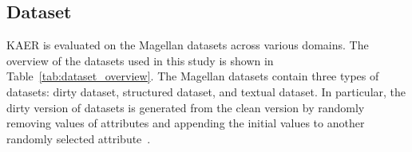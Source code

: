 \subsection{Dataset}

KAER is evaluated on the Magellan datasets \cite{magellandata} across various domains. 
The overview of the datasets used in this study is shown in Table~\ref{tab:dataset_overview}. 
The Magellan datasets contain three types of datasets: dirty dataset, structured dataset, and textual dataset.
In particular, the dirty version of datasets is generated from the clean version by randomly removing values of attributes and appending the initial values to another randomly selected attribute~\cite{li_deep_2020}.

\begin{table}[h]
\centering
{}
\caption{Dataset Summary}
\label{tab:dataset_overview}
\vspace{-0.5cm}
\end{table}







